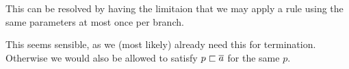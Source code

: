 \documentclass[a4paper]{article}
\begin{document}
This can be resolved by having the limitaion that we may apply
a rule using the same parameters at most once per branch.

This seems sensible, as we (most likely) already need this for termination.
Otherwise we would also be allowed to satisfy $p \sqsubset \overline{a}$ for the same $p$.


\end{document}
